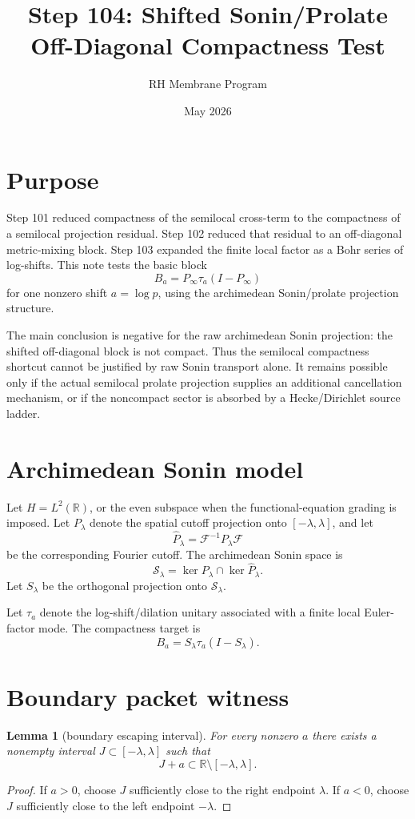 \documentclass[11pt]{article}
\title{Step 104: Shifted Sonin/Prolate Off-Diagonal Compactness Test}
\author{RH Membrane Program}
\date{May 2026}
\newtheorem{lemma}{Lemma}
\begin{document}
\maketitle

\section{Purpose}
Step 101 reduced compactness of the semilocal cross-term to the compactness of a semilocal projection residual. Step 102 reduced that residual to an off-diagonal metric-mixing block. Step 103 expanded the finite local factor as a Bohr series of log-shifts. This note tests the basic block
\[
B_a=P_\infty\tau_a(I-P_\infty)
\]
for one nonzero shift $a=\log p$, using the archimedean Sonin/prolate projection structure.

The main conclusion is negative for the raw archimedean Sonin projection: the shifted off-diagonal block is not compact. Thus the semilocal compactness shortcut cannot be justified by raw Sonin transport alone. It remains possible only if the actual semilocal prolate projection supplies an additional cancellation mechanism, or if the noncompact sector is absorbed by a Hecke/Dirichlet source ladder.

\section{Archimedean Sonin model}
Let $H=L^2(\mathbb R)$, or the even subspace when the functional-equation grading is imposed. Let $P_\lambda$ denote the spatial cutoff projection onto $[-\lambda,\lambda]$, and let
\[
\widehat P_\lambda=\mathcal F^{-1}P_\lambda\mathcal F
\]
be the corresponding Fourier cutoff. The archimedean Sonin space is
\[
\mathcal S_\lambda=\ker P_\lambda\cap\ker\widehat P_\lambda.
\]
Let $S_\lambda$ be the orthogonal projection onto $\mathcal S_\lambda$.

Let $\tau_a$ denote the log-shift/dilation unitary associated with a finite local Euler-factor mode. The compactness target is
\[
B_a=S_\lambda\tau_a(I-S_\lambda).
\]

\section{Boundary packet witness}
\begin{lemma}[boundary escaping interval]
For every nonzero $a$ there exists a nonempty interval $J\subset[-\lambda,\lambda]$ such that
\[
J+a\subset \mathbb R\setminus[-\lambda,\lambda].
\]
\end{lemma}
\begin{proof}
If $a>0$, choose $J$ sufficiently close to the right endpoint $\lambda$. If $a<0$, choose $J$ sufficiently close to the left endpoint $-\lambda$.
\end{proof}
\end{document}

